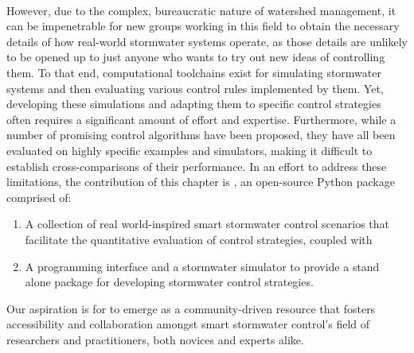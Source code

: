 \

However, due to the complex, bureaucratic nature of watershed management, it can be impenetrable for new groups working in this field to obtain the necessary details of how real-world stormwater systems operate, as those details are unlikely to be opened up to just anyone who wants to try out new ideas of controlling them. To that end, computational toolchains exist for simulating stormwater systems and then evaluating various control rules implemented by them. Yet, developing these simulations and adapting them to specific control strategies often requires a significant amount of effort and expertise.  Furthermore, while a number of promising control algorithms have been proposed, they have all been evaluated on highly specific examples and simulators, making it difficult to establish cross-comparisons of their performance. In an effort to address these limitations, the contribution of this chapter is \pystormsNOSPACE, an open-source Python package comprised of:
%
\begin{enumerate}
\item A collection of real world-inspired smart stormwater control scenarios that facilitate the quantitative evaluation of control strategies, coupled with
\item A programming interface and a stormwater simulator to provide a stand alone package for developing stormwater control strategies.
\end{enumerate}
%
Our aspiration is for \pystorms to emerge as a community-driven resource that fosters accessibility and collaboration amongst smart stormwater control's field of researchers and practitioners, both novices and experts alike. 
%
%
%
%
%
%
%
%
%
%
%
%
%
%
%
